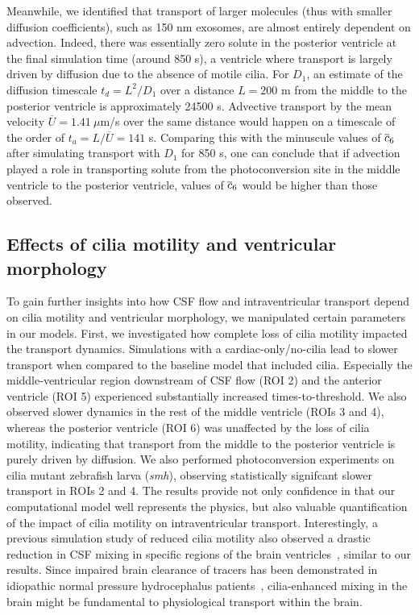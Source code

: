 \documentclass{WileyMSP-template}
\begin{document}
Meanwhile, we identified that transport of larger molecules
(thus with smaller diffusion coefficients),
such as 150 nm exosomes, are almost entirely dependent on advection.
Indeed, there was essentially zero solute in the posterior ventricle at the
final simulation time (around 850 s), a ventricle where transport is largely driven
by diffusion due to the absence of motile cilia.
For $D_1$, an estimate of the diffusion timescale $t_d=L^2/D_1$ over a distance
$L=200$ \textmu m from the middle to the posterior ventricle is approximately 24500 s.
Advective transport by the mean velocity $\overline{U}=1.41 \ \mu$m/s over the same
distance would happen on a timescale of the order of $t_a=L/\overline{U}=141$ s.
Comparing this with the minuscule values of $\overline{c}_6$ after simulating transport
with $D_1$ for 850 s, one can conclude that if advection
played a role in transporting solute from the photoconversion site in the middle ventricle
to the posterior ventricle, values of $\overline{c}_6$ would be higher than those observed.

\subsection{Effects of cilia motility and ventricular morphology}
To gain further insights into how CSF flow and intraventricular transport depend on cilia
motility and ventricular morphology, we manipulated certain
parameters in our models. First, we investigated how complete loss of cilia motility
impacted the transport dynamics. Simulations with a cardiac-only/no-cilia lead to
slower transport when compared to the baseline model that included cilia. Especially
the middle-ventricular region downstream of CSF flow (ROI 2) and the anterior ventricle (ROI 5)
experienced substantially increased times-to-threshold. We also observed
slower dynamics in the rest of the middle ventricle (ROIs 3 and 4), whereas the
posterior ventricle (ROI 6) was unaffected by the loss
of cilia motility, indicating that transport from the middle to the posterior ventricle is
purely driven by diffusion. We also performed photoconversion experiments on cilia mutant
zebrafish larva (\emph{smh}), observing statistically signifcant slower transport in 
ROIs 2 and 4. The results provide not only confidence in that our computational model
well represents the physics, but also valuable quantification of the impact of cilia motility
on intraventricular transport. Interestingly, a previous simulation study of reduced cilia motility
also observed a drastic reduction in CSF mixing in specific regions of the brain
ventricles~\cite{Yoshida2022EffectVentricles}, similar to our results. Since impaired brain 
clearance of tracers has been demonstrated in idiopathic normal pressure hydrocephalus
patients~\cite{Eide2020MagneticHydrocephalus}, cilia-enhanced mixing in the brain might be
fundamental to physiological transport within the brain.
\end{document}
